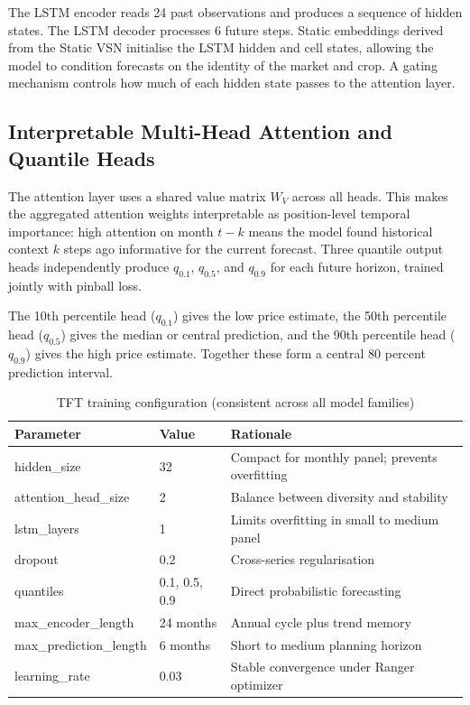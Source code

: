 \documentclass[12pt,a4paper]{report}
\begin{document}
The LSTM encoder reads 24 past observations and produces a sequence of hidden states.
The LSTM decoder processes 6 future steps. Static embeddings derived from the Static VSN
initialise the LSTM hidden and cell states, allowing the model to condition forecasts on the
identity of the market and crop. A gating mechanism controls how much of each hidden state
passes to the attention layer.

\subsection{Interpretable Multi-Head Attention and Quantile Heads}

The attention layer uses a shared value matrix $W_V$ across all heads. This makes the
aggregated attention weights interpretable as position-level temporal importance: high
attention on month $t-k$ means the model found historical context $k$ steps ago informative
for the current forecast. Three quantile output heads independently produce $q_{0.1}$,
$q_{0.5}$, and $q_{0.9}$ for each future horizon, trained jointly with pinball loss.

The 10th percentile head ($q_{0.1}$) gives the low price estimate, the 50th percentile head
($q_{0.5}$) gives the median or central prediction, and the 90th percentile head ($q_{0.9}$)
gives the high price estimate. Together these form a central 80 percent prediction interval.

\begin{table}[H]
\centering
\caption{TFT training configuration (consistent across all model families)}
\label{tab:ch5_tft_config}
\small
\begin{tabularx}{\textwidth}{L{0.36\textwidth}L{0.18\textwidth}X}
\toprule
\textbf{Parameter} & \textbf{Value} & \textbf{Rationale} \\
\midrule
hidden\_size            & 32       & Compact for monthly panel; prevents overfitting \\
attention\_head\_size   & 2        & Balance between diversity and stability \\
lstm\_layers            & 1        & Limits overfitting in small to medium panel \\
dropout                 & 0.2      & Cross-series regularisation \\
quantiles               & 0.1, 0.5, 0.9 & Direct probabilistic forecasting \\
max\_encoder\_length    & 24 months & Annual cycle plus trend memory \\
max\_prediction\_length & 6 months  & Short to medium planning horizon \\
learning\_rate          & 0.03      & Stable convergence under Ranger optimizer \\
\bottomrule
\end{tabularx}
\end{table}
\end{document}

